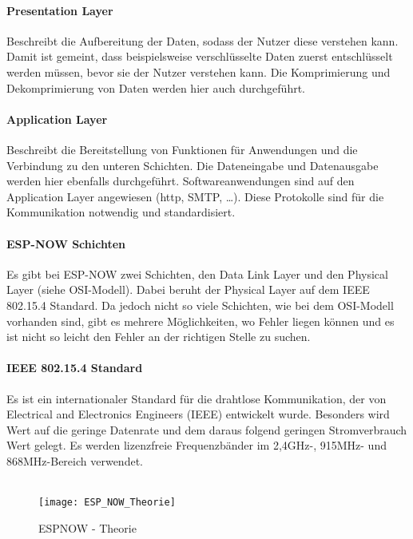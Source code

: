 \documentclass[titlepage,12pt,twoside]{article}
\begin{document}
\paragraph{Presentation Layer}
\hfill \break
\hfill \break
Beschreibt die Aufbereitung der Daten, sodass der Nutzer diese verstehen kann. Damit 
ist gemeint, dass beispielsweise verschlüsselte Daten zuerst entschlüsselt werden 
müssen, bevor sie der Nutzer verstehen kann. Die Komprimierung und Dekomprimierung 
von Daten werden hier auch durchgeführt. \\

\paragraph{Application Layer}
\hfill \break
\hfill \break
Beschreibt die Bereitstellung von Funktionen für Anwendungen und die Verbindung zu 
den unteren Schichten. Die Dateneingabe und Datenausgabe werden hier ebenfalls 
durchgeführt. Softwareanwendungen sind auf den Application Layer angewiesen (http, SMTP, …). 
Diese Protokolle sind für die Kommunikation notwendig und standardisiert. \\

\paragraph{ESP-NOW Schichten}
\hfill \break
\hfill \break
Es gibt bei ESP-NOW zwei Schichten, den Data Link Layer und den Physical Layer 
(siehe OSI-Modell). Dabei beruht der Physical Layer auf dem IEEE 802.15.4 Standard. 
Da jedoch nicht so viele Schichten, wie bei dem OSI-Modell vorhanden sind, gibt es 
mehrere Möglichkeiten, wo Fehler liegen können und es ist nicht so leicht den Fehler 
an der richtigen Stelle zu suchen. \\

\paragraph{IEEE 802.15.4 Standard}
\hfill \break
\hfill \break
Es ist ein internationaler Standard für die drahtlose Kommunikation, der von 
Electrical and Electronics Engineers (IEEE) entwickelt wurde. Besonders wird Wert auf 
die geringe Datenrate und dem daraus folgend geringen Stromverbrauch Wert gelegt. Es 
werden lizenzfreie Frequenzbänder im 2,4GHz-, 915MHz- und 868MHz-Bereich verwendet. \\
\\
\begin{figure}[H]
	\begin{center}
		\scalebox{0.8}
		{\texttt{[image: ESP\_NOW\_Theorie]}}
		\caption{ESPNOW - Theorie}
		\label{fig:ESP_NOW_Theorie}
	\end{center}
\end{figure}
\hfill \break
\end{document}
